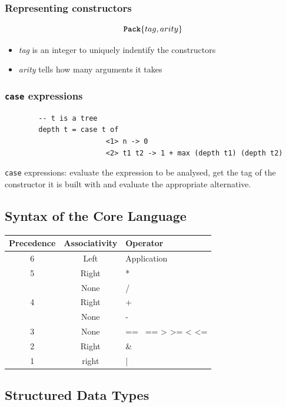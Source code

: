 \documentclass [11pt, a4paper]{article}
\begin{document}
\begin{flushleft}
    \subsubsection{Representing constructors}
    \begin{displaymath}
        \textbf{\texttt{Pack}}\{tag, arity\}
    \end{displaymath}
    \begin{itemize}
        \item \emph{tag} is an integer to uniquely indentify the constructors
        \item \emph{arity} tells how many arguments it takes
    \end{itemize}

    \subsubsection{ \texttt{case} expressions}
    \begin{verbatim}
        -- t is a tree
        depth t = case t of
                        <1> n -> 0
                        <2> t1 t2 -> 1 + max (depth t1) (depth t2)     
    \end{verbatim}
    \texttt{case} expressions: evaluate the expression to be analysed, get the tag of the constructor it is built with and 
    evaluate the appropriate alternative.

    \subsection{Syntax of the Core Language}

    \begin{tabular}{|c|c|l|}
        \hline
        Precedence & Associativity & Operator \\
        \hline
        6 & Left & Application \\
        5 & Right & * \\
        & None & / \\
        4 & Right & + \\
        & None & - \\
        3 & None & == ~== > >= < <= \\
        2 & Right & \& \\
        1 & right & | \\
        \hline
    \end{tabular}

    \newpage
    \subsection{Structured Data Types}


\end{flushleft}
\end{document}
